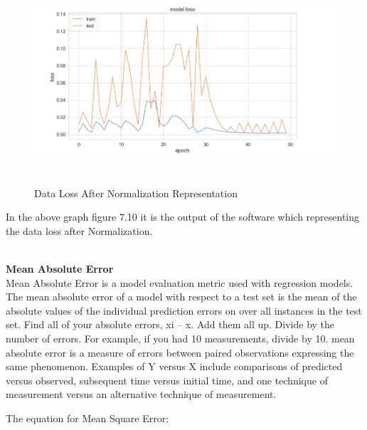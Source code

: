 \documentclass[openany,12pt]{report}
\begin{document}
{{\begin{figure}[H]
\centering
\includegraphics[width=5in,height=3in]{./Data Normalization.jpeg}
\caption{Data Loss After Normalization Representation}
\end{figure}
In the above graph figure 7.10 it is the output of the software which representing the data loss after Normalization.
\\
\\
\item{\textbf{Mean Absolute Error}\\ Mean Absolute Error is a model evaluation metric used with regression models. The mean absolute error of a model with respect to a test set is the mean of the absolute values of the individual prediction errors on over all instances in the test set.
Find all of your absolute errors, xi – x. Add them all up. Divide by the number of errors. For example, if you had 10 measurements, divide by 10.
mean absolute error is a measure of errors between paired observations expressing the same phenomenon. Examples of Y versus X include comparisons of predicted versus observed, subsequent time versus initial time, and one technique of measurement versus an alternative technique of measurement.

\newpage
The equation for Mean Square Error:\\


}}}
\end{document}
